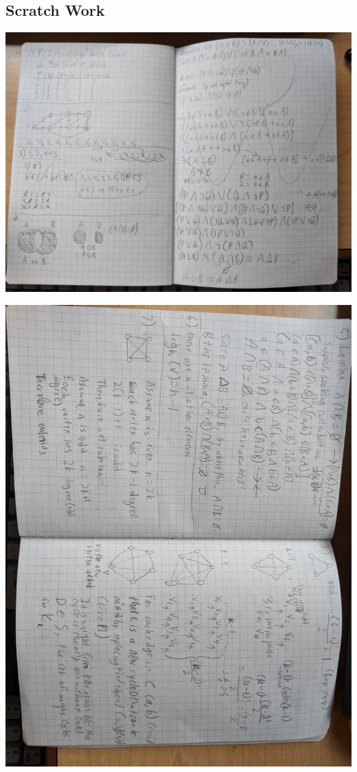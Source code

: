 \documentclass{article}
\begin{document}
\begin{landscape}
    \section{Scratch Work}

    \centering
    \thispagestyle{empty}
    \includegraphics[width=0.9\linewidth]{mt/1.jpg}

    \pagebreak
    
    \centering
    \thispagestyle{empty}
    \includegraphics[angle=90, width=0.9\linewidth]{mt/2.jpg}


\end{landscape}
\end{document}
